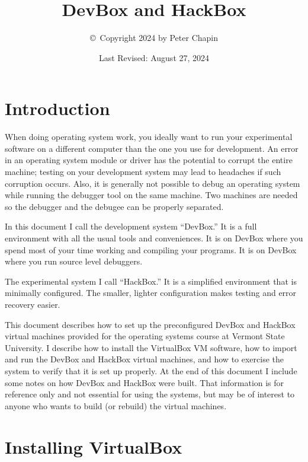 \documentclass{article}
\begin{document}
\title{DevBox and HackBox}
\author{\copyright\ Copyright 2024 by Peter Chapin}
\date{Last Revised: August 27, 2024}
\maketitle

\tableofcontents

\section{Introduction}

When doing operating system work, you ideally want to run your experimental software on a
different computer than the one you use for development. An error in an operating system module
or driver has the potential to corrupt the entire machine; testing on your development system
may lead to headaches if such corruption occurs. Also, it is generally not possible to debug an
operating system while running the debugger tool on the same machine. Two machines are needed so
the debugger and the debugee can be properly separated.

In this document I call the development system ``DevBox.'' It is a full environment with all the
usual tools and conveniences. It is on DevBox where you spend most of your time working and
compiling your programs. It is on DevBox where you run source level debuggers.

The experimental system I call ``HackBox.'' It is a simplified environment that is minimally
configured. The smaller, lighter configuration makes testing and error recovery easier.

This document describes how to set up the preconfigured DevBox and HackBox virtual machines
provided for the operating systems course at Vermont State University. I describe how to install
the VirtualBox VM software, how to import and run the DevBox and HackBox virtual machines, and
how to exercise the system to verify that it is set up properly. At the end of this document I
include some notes on how DevBox and HackBox were built. That information is for reference only
and not essential for using the systems, but may be of interest to anyone who wants to build (or
rebuild) the virtual machines.

\section{Installing VirtualBox}
\end{document}
